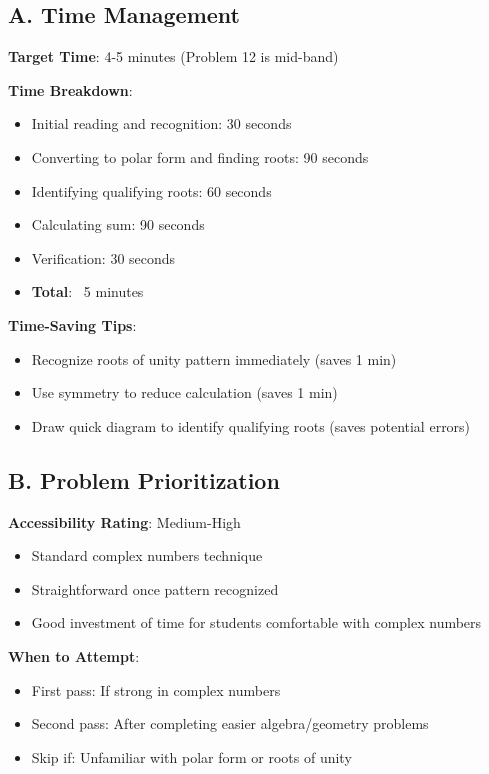 \documentclass[11pt]{article}
\begin{document}
\begin{competitionbox}
\subsection*{A. Time Management}

\textbf{Target Time}: 4-5 minutes (Problem 12 is mid-band)

\textbf{Time Breakdown}:
\begin{itemize}[leftmargin=*]
    \item Initial reading and recognition: 30 seconds
    \item Converting to polar form and finding roots: 90 seconds
    \item Identifying qualifying roots: 60 seconds
    \item Calculating sum: 90 seconds
    \item Verification: 30 seconds
    \item \textbf{Total}: ~5 minutes
\end{itemize}

\textbf{Time-Saving Tips}:
\begin{itemize}[leftmargin=*]
    \item Recognize roots of unity pattern immediately (saves 1 min)
    \item Use symmetry to reduce calculation (saves 1 min)
    \item Draw quick diagram to identify qualifying roots (saves potential errors)
\end{itemize}

\subsection*{B. Problem Prioritization}

\textbf{Accessibility Rating}: Medium-High
\begin{itemize}[leftmargin=*]
    \item Standard complex numbers technique
    \item Straightforward once pattern recognized
    \item Good investment of time for students comfortable with complex numbers
\end{itemize}

\textbf{When to Attempt}:
\begin{itemize}[leftmargin=*]
    \item First pass: If strong in complex numbers
    \item Second pass: After completing easier algebra/geometry problems
    \item Skip if: Unfamiliar with polar form or roots of unity
\end{itemize}


\end{competitionbox}
\end{document}

